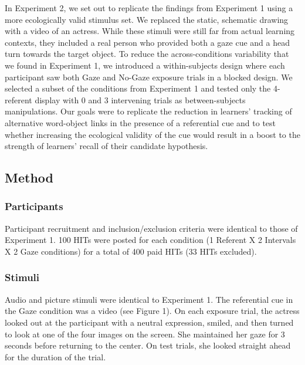 \documentclass[oneside]{report}
\begin{document}
In Experiment 2, we set out to replicate the findings from Experiment 1
using a more ecologically valid stimulus set. We replaced the static,
schematic drawing with a video of an actress. While these stimuli were
still far from actual learning contexts, they included a real person who
provided both a gaze cue and a head turn towards the target object. To
reduce the across-conditions variability that we found in Experiment 1,
we introduced a within-subjects design where each participant saw both
Gaze and No-Gaze exposure trials in a blocked design. We selected a
subset of the conditions from Experiment 1 and tested only the
4-referent display with 0 and 3 intervening trials as between-subjects
manipulations. Our goals were to replicate the reduction in learners'
tracking of alternative word-object links in the presence of a
referential cue and to test whether increasing the ecological validity
of the cue would result in a boost to the strength of learners' recall
of their candidate hypothesis.

\hypertarget{method-1}{%
\subsection{Method}\label{method-1}}

\hypertarget{participants-1}{%
\subsubsection{Participants}\label{participants-1}}

Participant recruitment and inclusion/exclusion criteria were identical
to those of Experiment 1. 100 HITs were posted for each condition (1
Referent X 2 Intervals X 2 Gaze conditions) for a total of 400 paid HITs
(33 HITs excluded).

\hypertarget{stimuli-2}{%
\subsubsection{Stimuli}\label{stimuli-2}}

Audio and picture stimuli were identical to Experiment 1. The
referential cue in the Gaze condition was a video (see Figure 1). On
each exposure trial, the actress looked out at the participant with a
neutral expression, smiled, and then turned to look at one of the four
images on the screen. She maintained her gaze for 3 seconds before
returning to the center. On test trials, she looked straight ahead for
the duration of the trial.
\end{document}
